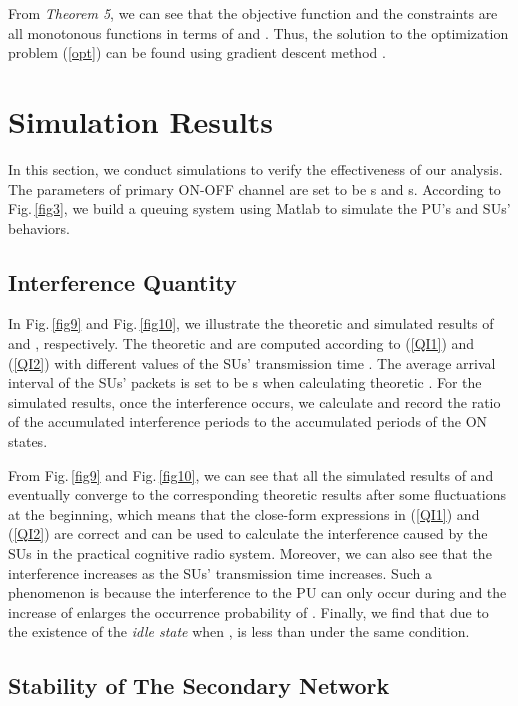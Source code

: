 \documentclass[11pt,draftcls]{IEEEtran}{\onecolumn}
\begin{document}
From \emph{Theorem 5}, we can see that the objective function and
the constraints are all monotonous functions in terms of  and
. Thus, the solution to the optimization problem
(\ref{opt}) can be found using gradient descent method \cite{14}.

\section{Simulation Results}\label{simu}

In this section, we conduct simulations to verify the effectiveness
of our analysis. The parameters of primary ON-OFF channel are set to
be s and s. According to
Fig.\,\ref{fig3}, we build a queuing system using Matlab to simulate
the PU's and SUs' behaviors.

\subsection{Interference Quantity }

In Fig.\,\ref{fig9} and Fig.\,\ref{fig10}, we illustrate the
theoretic and simulated results of  and ,
respectively. The theoretic  and  are computed
according to (\ref{QI1}) and (\ref{QI2}) with different values of
the SUs' transmission time . The average arrival interval of
the SUs' packets  is set to be s when calculating
theoretic . For the simulated results, once the
interference occurs, we calculate and record the ratio of the
accumulated interference periods to the accumulated periods of the
ON states.

From Fig.\,\ref{fig9} and Fig.\,\ref{fig10}, we can see that all the
simulated results of  and  eventually converge to
the corresponding theoretic results after some fluctuations at the
beginning, which means that the close-form expressions in
(\ref{QI1}) and (\ref{QI2}) are correct and can be used to calculate
the interference caused by the SUs in the practical cognitive radio
system. Moreover, we can also see that the interference increases as
the SUs' transmission time  increases. Such a phenomenon is
because the interference to the PU can only occur during  and
the increase of  enlarges the occurrence probability of .
Finally, we find that due to the existence of the \emph{idle state}
when ,   is less than  under the
same condition.

\subsection{Stability of The Secondary Network}
\end{document}
